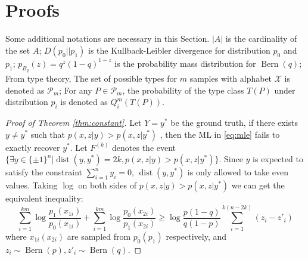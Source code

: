 \documentclass[conference]{IEEEtran}
\DeclareMathOperator{\dist}{dist}
\DeclareMathOperator{\Bern}{Bern}
\begin{document}
\section{Proofs}\label{s:proof}
Some additional notations are necessary in this Section. $|A|$ is the cardinality of the set $A$;
$D(p_0 || p_1)$ is the Kullback-Leibler divergence for distribution $p_0$ and $p_1$;
$p_{B_q}(z) = q^z(1-q)^{1-z}$ is the probability mass distribution for $\Bern(q)$;
From type theory, The set of possible types
for $m$ samples with alphabet $\mathcal{X}$ is denoted as $\mathcal{P}_m$; For any $P\in \mathcal{P}_m$, the probability of the type
class $T(P)$ under distribution $p_i$ is denoted as $Q_i^{m}(T(P))$.
\begin{proof}[Proof of Theorem \ref{thm:constant}]
Let $Y=y^*$ be the ground truth, if there exists $y\neq y^*$ such that $p(x,z|y) > p(x,z|y^*)$	,
then the ML in \eqref{eq:mle} fails to exactly recover $y^*$. Let $F^{(k)}$ denotes
the event $\{\exists y \in \{\pm 1\}^n | \dist(y, y^*)=2k, p(x,z|y) > p(x,z|y^*) \}$. Since
$y$ is expected to satisfy the constraint $\sum_{i=1}^n y_i=0$, $\dist(y, y^*)$ is only allowed to take even
values. Taking $\log$ on both sides of $p(x,z|y) > p(x,z|y^*)$ we can get the equivalent inequality:
{\footnotesize
\begin{equation}\label{eq:ein}
\sum_{i=1}^{km} \log \frac{p_1(x_{1i})}{p_0(x_{1i})}
+\sum_{i=1}^{km} \log \frac{p_0(x_{2i})}{p_1(x_{2i})}
\geq \log \frac{p(1-q)}{q(1-p)} \sum_{i=1}^{k(n-2k)}(z_{i} - z'_{i})
\end{equation}
}
where $x_{1i}(x_{2i})$ are sampled from $p_0(p_1)$ respectively,
and $z_{i} \sim \Bern(p), z'_{i} \sim \Bern(q)$.


\end{proof}
\end{document}
